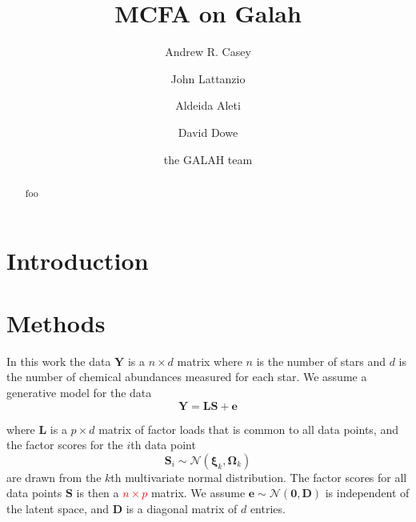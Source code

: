 \documentclass[twocolumn]{aastex61}
\newcommand{\todo}[1]{\textcolor{red}{#1}}
\newcommand{\vect}[1]{\boldsymbol{\mathbf{#1}}}
\renewcommand{\vec}[1]{\vect{#1}}
\newcommand{\data}{\textbf{Y}}
\newcommand{\vecdata}{\vec\data}
\newcommand{\factorloads}{\textbf{L}}
\newcommand{\factorscores}{\textbf{S}}
\newcommand{\specificvariance}{\vec{D}}
\begin{document}
\title{MCFA on Galah}


\author[0000-0003-0174-0564]{Andrew R. Casey}
			 
\author{John Lattanzio}

\author{Aldeida Aleti}

\author{David Dowe}

\author{the GALAH team}


\begin{abstract}
foo
\end{abstract}



\section{Introduction} \label{sec:intro}

\section{Methods} \label{sec:methods}


In this work the data $\vecdata$ is a $n \times d$ matrix 
where $n$ is the number of stars and $d$ is the number of
chemical abundances measured for each star. We assume a
generative model for the data 
\begin{equation}
	\vecdata = \factorloads\factorscores + \vec{e}
	\label{eq:generative-model}
\end{equation}

\noindent{}where $\factorloads$ is a $p \times d$ matrix of factor
loads that is common to all data points, and the factor scores for
the $i$th data point
\begin{equation}
	\factorscores_i \sim \mathcal{N}(\vec\xi_k, \vec\Omega_k)
\end{equation}
\noindent{}are drawn from the $k$th multivariate  normal distribution.
The factor scores for all data points $\factorscores$ is then a 
\todo{$n \times p$} matrix.
 We assume $\vec{e} \sim \mathcal{N}\left(\vec{0}, \specificvariance\right)$
is independent of the latent space, and $\specificvariance$ is a
diagonal matrix of $d$ entries. 
\end{document}
